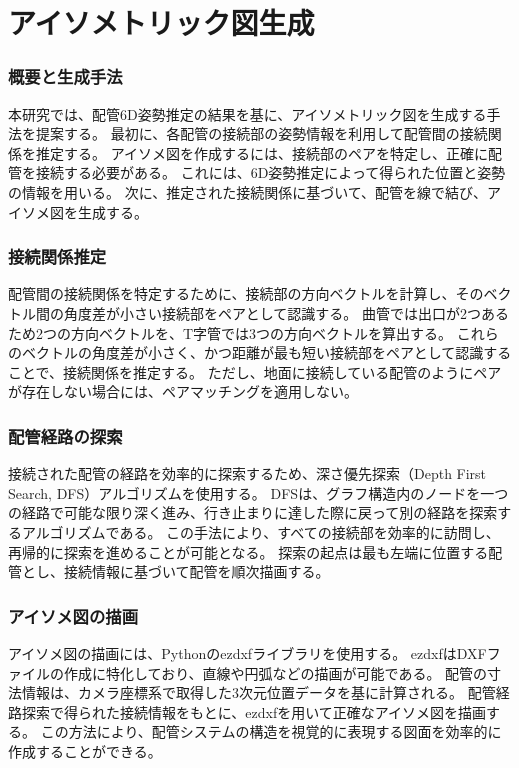 \chapter{アイソメトリック図生成}

\subsection{概要と生成手法} 
本研究では、配管6D姿勢推定の結果を基に、アイソメトリック図を生成する手法を提案する。
最初に、各配管の接続部の姿勢情報を利用して配管間の接続関係を推定する。
アイソメ図を作成するには、接続部のペアを特定し、正確に配管を接続する必要がある。
これには、6D姿勢推定によって得られた位置と姿勢の情報を用いる。
次に、推定された接続関係に基づいて、配管を線で結び、アイソメ図を生成する。

\subsection{接続関係推定} 
配管間の接続関係を特定するために、接続部の方向ベクトルを計算し、そのベクトル間の角度差が小さい接続部をペアとして認識する。
曲管では出口が2つあるため2つの方向ベクトルを、T字管では3つの方向ベクトルを算出する。
これらのベクトルの角度差が小さく、かつ距離が最も短い接続部をペアとして認識することで、接続関係を推定する。
ただし、地面に接続している配管のようにペアが存在しない場合には、ペアマッチングを適用しない。

\subsection{配管経路の探索} 
接続された配管の経路を効率的に探索するため、深さ優先探索（Depth First Search, DFS）アルゴリズムを使用する。
DFSは、グラフ構造内のノードを一つの経路で可能な限り深く進み、行き止まりに達した際に戻って別の経路を探索するアルゴリズムである。
この手法により、すべての接続部を効率的に訪問し、再帰的に探索を進めることが可能となる。
探索の起点は最も左端に位置する配管とし、接続情報に基づいて配管を順次描画する。

\subsection{アイソメ図の描画} 
アイソメ図の描画には、Pythonのezdxfライブラリを使用する。
ezdxfはDXFファイルの作成に特化しており、直線や円弧などの描画が可能である。
配管の寸法情報は、カメラ座標系で取得した3次元位置データを基に計算される。
配管経路探索で得られた接続情報をもとに、ezdxfを用いて正確なアイソメ図を描画する。
この方法により、配管システムの構造を視覚的に表現する図面を効率的に作成することができる。

